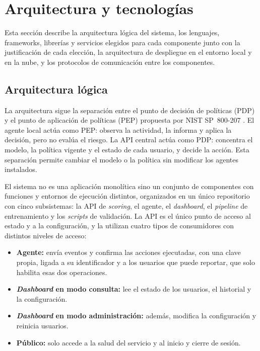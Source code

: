 \chapter{Arquitectura y tecnologías}
\label{chap:arquitectura}

Esta sección describe la arquitectura lógica del sistema, los lenguajes, frameworks, librerías y servicios elegidos para cada componente junto con la justificación de cada elección, la arquitectura de despliegue en el entorno local y en la nube, y los protocolos de comunicación entre los componentes.

\section{Arquitectura lógica}
\label{sec:arquitectura-logica}
La arquitectura sigue la separación entre el punto de decisión de políticas (PDP) y el punto de aplicación de políticas (PEP) propuesta por NIST SP~800-207 \parencite{Rose2020}. El agente local actúa como PEP: observa la actividad, la informa y aplica la decisión, pero no evalúa el riesgo. La API central actúa como PDP: concentra el modelo, la política vigente y el estado de cada usuario, y decide la acción. Esta separación permite cambiar el modelo o la política sin modificar los agentes instalados.

El sistema no es una aplicación monolítica sino un conjunto de componentes con funciones y entornos de ejecución distintos, organizados en un único repositorio con cinco subsistemas: la API de \emph{scoring}, el agente, el \emph{dashboard}, el \emph{pipeline} de entrenamiento y los \emph{scripts} de validación. La API es el único punto de acceso al estado y a la configuración, y la utilizan cuatro tipos de consumidores con distintos niveles de acceso:
\begin{itemize}
	\item \textbf{Agente:} envía eventos y confirma las acciones ejecutadas, con una clave propia, ligada a su identificador y a los usuarios que puede reportar, que solo habilita esas dos operaciones.
	\item \textbf{\emph{Dashboard} en modo consulta:} lee el estado de los usuarios, el historial y la configuración.
	\item \textbf{\emph{Dashboard} en modo administración:} además, modifica la configuración y reinicia usuarios.
	\item \textbf{Público:} solo accede a la salud del servicio y al inicio y cierre de sesión.
\end{itemize}

